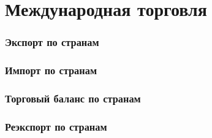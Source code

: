 \section{Международная торговля}

\begin{frame}
    \frametitle{Экспорт по странам}
    \begin{center}
        
    \end{center}
\end{frame}

\begin{frame}
    \frametitle{Импорт по странам}
    \begin{center}
        
    \end{center}
\end{frame}

\begin{frame}
    \frametitle{Торговый баланс по странам}
    \begin{center}
        
    \end{center}
\end{frame}

\begin{frame}
    \frametitle{Реэкспорт по странам}
    \begin{center}
        
    \end{center}
\end{frame}